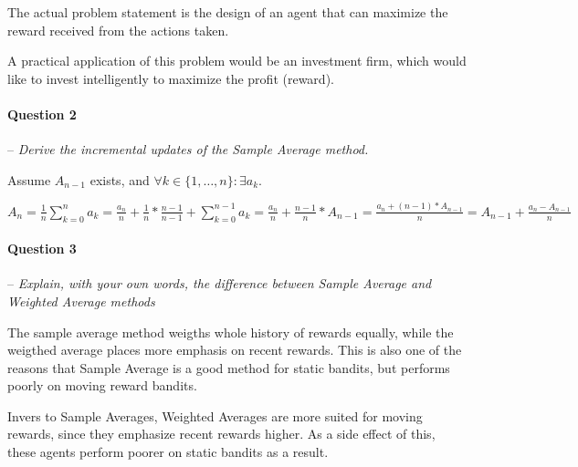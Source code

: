 \documentclass[a4paper]{article}
\newcommand{\question}[2]{
\paragraph{Question #1} -- \textit{#2}

}
\begin{document}
			The actual problem statement is the design of an agent that can maximize the reward received from the actions taken.

			A practical application of this problem would be an investment firm, which would like to invest intelligently to maximize the profit (reward).

		\question{2}{Derive the incremental updates of the Sample Average method.}
			Assume $ A_{n-1} $ exists, and $ \forall k \in \{1,\dots,n\}: \exists a_k $.

			$ A_n = \frac{1}{n} \sum_{k=0}^{n}{a_k} = \frac{a_n}{n} + \frac{1}{n} * \frac{n-1}{n-1} + \sum_{k=0}^{n-1}{a_k} = \frac{a_n}{n} + \frac{n-1}{n} * A_{n-1} = \frac{a_n + (n-1) * A_{n-1}}{n} = A_{n-1} + \frac{a_n - A_{n-1}}{n} $

		\question{3}{Explain, with your own words, the difference between Sample Average and Weighted Average methods}
			The sample average method weigths whole history of rewards equally, while the weigthed average places more emphasis on recent rewards.
			This is also one of the reasons that Sample Average is a good method for static bandits, but performs poorly on moving reward bandits.

			Invers to Sample Averages, Weighted Averages are more suited for moving rewards, since they emphasize recent rewards higher.
			As a side effect of this, these agents perform poorer on static bandits as a result.
\end{document}
